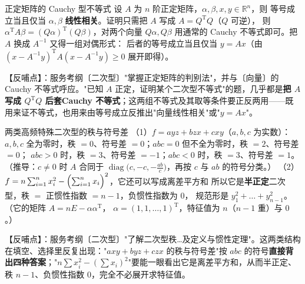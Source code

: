 \begin{fdeep}{正定矩阵的 Cauchy 型不等式}
设 $A$ 为 $n$ 阶正定矩阵，$\alpha,\beta,x,y\in\mathbb R^{n}$，则
等号成立当且仅当 $\alpha,\beta$ \textbf{线性相关}。证明只需把 $A$ 写成 $A=Q^{\mathrm T}Q$（$Q$ 可逆），
则 $\alpha^{\mathrm T}A\beta=(Q\alpha)^{\mathrm T}(Q\beta)$，对两个向量 $Q\alpha,Q\beta$ 用通常的
Cauchy 不等式即可。把 $A$ 换成 $A^{-1}$ 又得一组对偶形式：
后者的等号成立当且仅当 $y=Ax$（由 $(x-A^{-1}y)^{\mathrm T}A(x-A^{-1}y)\ge0$ 展开即得）。

【反哺点】：服务考纲〔二次型〕"掌握正定矩阵的判别法"，并与〔向量〕的 Cauchy 不等式呼应。"已知 $A$ 正定，证明某个二次型不等式"的题，几乎都是\textbf{把 $A$ 写成 $Q^{\mathrm T}Q$ 后套Cauchy 不等式}；这两组不等式及其取等条件要正反两用——既用来证不等式，也用来由等号成立反推出"向量线性相关"或"$y=Ax$"。
\end{fdeep}

\begin{fdeep}{两类高频特殊二次型的秩与符号差}
（1）$f=ayz+bzx+cxy$（$a,b,c$ 为实数）：
$a,b,c$ 全为零时，秩 $=0$、符号差 $=0$；$abc=0$ 但不全为零时，秩 $=2$、符号差 $=0$；
$abc>0$ 时，秩 $=3$、符号差 $=-1$；$abc<0$ 时，秩 $=3$、符号差 $=1$。
（推导：$c\ne0$ 时 $A$ 合同于 $\operatorname{diag}\bigl(c,-c,-\frac{ab}{c}\bigr)$，再按 $c$ 与 $ab$ 的符号分类。）
（2）$f=n\sum_{i=1}^{n}x_i^{2}-\Bigl(\sum_{i=1}^{n}x_i\Bigr)^{2}$，它还可以写成离差平方和
所以它是\textbf{半正定}二次型，秩 $=$ 正惯性指数 $=n-1$，负惯性指数为 $0$，
规范形是 $y_1^{2}+\dots+y_{n-1}^{2}$。（它的矩阵 $A=nE-\alpha\alpha^{\mathrm T}$，
$\alpha=(1,1,\dots,1)^{\mathrm T}$，特征值为 $n$（$n-1$ 重）与 $0$。）

【反哺点】：服务考纲〔二次型〕"了解二次型秩…及定义与惯性定理"。这两类结构在填空、选择里反复出现："$axy+byz+czx$ 的秩与符号差"按 $abc$ 的符号\textbf{直接背出四种答案}；"$n\sum x_i^{2}-(\sum x_i)^{2}$"要能一眼看出它是离差平方和，从而半正定、秩 $n-1$、负惯性指数 $0$，完全不必展开求特征值。
\end{fdeep}


